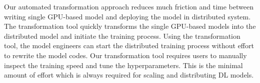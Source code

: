 Our automated transformation approach reduces much friction and time between
writing single GPU-based model and deploying the model in distributed system.
The transformation tool quickly transforms the single GPU-based
models into the distributed model and initiate the training process.
Using the transformation tool, the model engineers can start the distributed
training process without effort to rewrite the model codes. 
Our transformation tool requires users to manually inspect the
training speed and tune the hyperparameters.
This is the minimal amount of effort which is always required for
scaling and distributing DL models.
